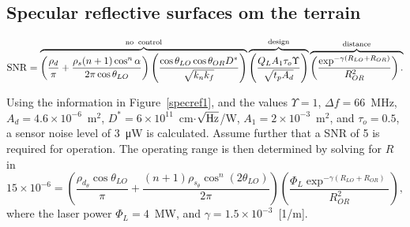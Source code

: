 


\subsection{Specular reflective surfaces om the terrain}

\begin{equation}
\operatorname{SNR}=
\overbrace{\left(\frac{\rho_d}{\pi} + \frac{\rho_s(n+1)\cos^n\alpha}{2\pi\cos\theta_{LO}}\right)
\left(\frac{  \cos\theta_{LO} \cos\theta_{OR} D^\ast }{\sqrt{k_nk_f}}\right)
}^{\rm no\;\;control}
\overbrace{
\left(\frac{Q_L A_1 \tau_o \Upsilon}{\sqrt{t_p A_d}}\right)
}^{\rm design}
\overbrace{
\left(\frac{\exp^{-\gamma (R_{LO}+R_{OR})} }{R^2_{OR}}\right).\\
}^{\rm distance}
\label{lrfd2e}
\end{equation}




Using the information in Figure~\ref{specref1},  and the values $\Upsilon = 1$, 
$\Delta f=66$~MHz, $A_d=4.6\times10^{-6}$~m$^2$,
$D^\ast=6\times10^{11}$~cm$\cdot$$\sqrt{\rm Hz}$/W, $A_1=2\times10^{-3}$~m$^2$,
and $\tau_o=0.5$, a sensor noise level of 3~\si{\micro\watt}{} is calculated.
Assume further that a SNR of 5 is required for
operation. The operating range is then determined by solving for $R$ in
\begin{equation}
15\times 10^{-6} = \left(
\frac{\rho_{d_\theta}\cos \theta_{LO}}{\pi}+
\frac{(n+1)\rho_{s_\theta}\cos^n (2\theta_{LO})}{2\pi}
\right)
\left(\frac{
\Phi_L \exp^{-\gamma (R_{LO}+R_{OR})}}{ R^2_{OR} }
\right),
\label{lrfi5}
\end{equation}
where the laser power $\Phi_L=4$~MW, and $\gamma=1.5\times10^{-3}$~[1/m].


